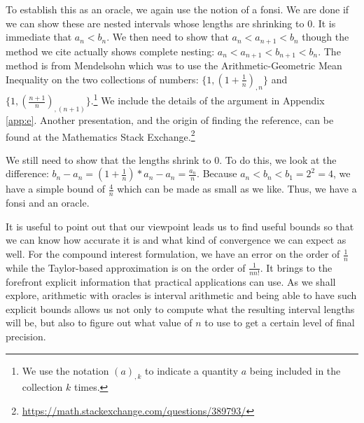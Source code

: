 \documentclass[12pt]{article}
\theoremstyle{remark}
\begin{document}
To establish this as an oracle, we again use the notion of a fonsi. We are done if we can show these are nested intervals whose lengths are shrinking to 0. It is immediate that $a_n < b_n$. We then need to show that $a_n < a_{n+1} < b_n$ though the method we cite actually shows complete nesting: $a_n < a_{n+1} < b_{n+1} < b_n$. The method is from Mendelsohn \cite{mend} which was to use the Arithmetic-Geometric Mean Inequality on the two collections of numbers: $\{1, (1+ \frac{1}{n})_{,n} \}$ and $\{1, (\frac{n+1}{n})_{,(n+1)}\}$.\footnote{We use the notation $(a)_{,k}$ to indicate a quantity $a$ being included in the collection $k$ times.} We include the details of the argument in Appendix \ref{app:e}.  Another presentation, and the origin of finding the reference, can be found at the Mathematics Stack Exchange.\footnote{ \url{https://math.stackexchange.com/questions/389793/}}

We still need to show that the lengths shrink to 0. To do this, we look at the difference: $b_n - a_n = (1+\tfrac{1}{n})*a_n - a_n = \tfrac{a_n}{n}$. Because $a_n < b_n < b_1=2^2 = 4$, we have a simple bound of $\tfrac{4}{n}$ which can be made as small as we like. Thus, we have a fonsi and an oracle. 

It is useful to point out that our viewpoint leads us to find useful bounds so that we can know how accurate it is and what kind of convergence we can expect as well. For the compound interest formulation, we have an error on the order of $\frac{1}{n}$ while the Taylor-based approximation is on the order of $\frac{1}{n n!}$. It brings to the forefront explicit information that practical applications can use. As we shall explore, arithmetic with oracles is interval arithmetic and being able to have such explicit bounds allows us not only to compute what the resulting interval lengths will be, but also to figure out what value of $n$ to use to get a certain level of final precision. 
\end{document}
